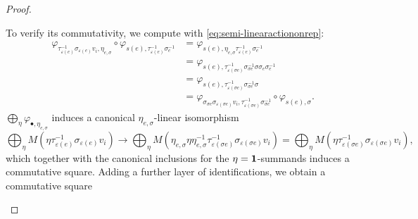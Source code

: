 \documentclass[a4paper,12pt,reqno]{amsart}
\theoremstyle{plain}
\theoremstyle{remark}
\begin{document}
\begin{proof}
\begin{center}
    \end{center}
    To verify its commutativity, we compute with \eqref{eq:semi-linearactiononrep}:
    \begin{align*}
      \varphi_{\tau_{\varepsilon( e)}^{-1}\sigma_{\varepsilon( e)}v_i,\eta_{e,\sigma}}
      \circ
      \varphi_{s(e),\tau_{\varepsilon(e)}^{-1}\sigma_e^{-1}}
      &=
      \varphi_{s(e),\eta_{e,\sigma}\tau_{\varepsilon(e)}^{-1}\sigma_e^{-1}}\\
      &=
      \varphi_{s(e),\tau_{\varepsilon(\sigma e)}^{-1}\sigma_{\sigma e}^{-1}\sigma\sigma_e\sigma_e^{-1}}\\
      &=
      \varphi_{s(e),\tau_{\varepsilon(\sigma e)}^{-1}\sigma_{\sigma e}^{-1}\sigma}\\
      &=
      \varphi_{\sigma_{\sigma e}\sigma_{\varepsilon(\sigma e)}v_i,\tau_{\varepsilon(\sigma e)}^{-1}\sigma_{\sigma e}^{-1}}
      \circ
      \varphi_{s(e),\sigma}.
    \end{align*}
    $\bigoplus\limits_\eta\varphi_{\bullet,\eta_{e,\sigma}}$ induces a canonical $\eta_{e,\sigma}$-linear isomorphism
    \[
    \bigoplus_{\eta}
    M(\eta\tau_{\varepsilon(e)}^{-1}\sigma_{\varepsilon(e)} v_i)
    \to
    \bigoplus_{\eta}
    M(\eta_{e,\sigma}\eta\eta_{e,\sigma}^{-1}\tau_{\varepsilon(\sigma e)}^{-1}\sigma_{\varepsilon(\sigma e)} v_i)
    =
    \bigoplus_{\eta}
    M(\eta\tau_{\varepsilon(\sigma e)}^{-1}\sigma_{\varepsilon(\sigma e)} v_i),
    \]
    which together with the canonical inclusions for the $\eta={\bf1}$-summands induces a commutative square. Adding a further layer of identifications, we obtain a commutative square
    \begin{center}
\end{center}
\end{proof}
\end{document}
